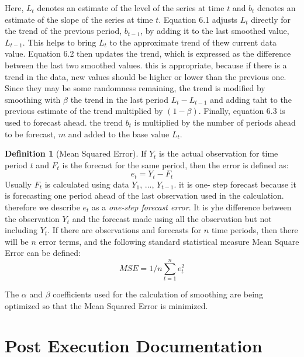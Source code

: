 \documentclass[a4paper,11pt,twoside]{report}
\theoremstyle{definition}
\newtheorem{definition}[theorem]{Definition}
\begin{document}
Here, $L_t$ denotes an estimate of the level of the series at time $t$ and $b_t$ denotes an estimate of the slope of the series at time $t$. Equation 6.1 adjusts $L_t$ directly for the trend of the previous period, $b_{t-1}$, by adding it to the last smoothed value, $L_{t-1}$. This helps to bring $L_t$ to the approximate trend of thew current data value. Equation 6.2 then updates the trend, which is expressed as the difference between the last two smoothed values. this is appropriate, because if there is a trend in the data, new values should be higher or lower than the previous one. Since they may be some randomness remaining, the trend is modified by smoothing with $\beta$ the trend in the last period $L_t - L_{t-1}$ and adding taht to the previous estimate of the trend multiplied by $ (1 - \beta)$. Finally, equation 6.3 is used to forecast ahead. the trend $b_t$ is multiplied by the number of periods ahead to be forecast, $m$ and added to the base value $L_t$.
\begin{definition}[Mean Squared Error]
If $Y_t$ is the actual observation for time period $t$ and $F_t$ is the forecast for the same period, then the error is defined as:
\begin{equation}\label{Error}
e_t = Y_t - F_t
\end{equation}
Usually $F_t$ is calculated using data $Y_1$, ..., $Y_{t-1}$. it is one- step forecast because it is forecasting one period ahead of the last observation used in the calculation. therefore we describe $e_t$ as a \textit{one-step forecast error}. It is yhe difference between the observation $Y_t$ and the forecast made using all the observation but not including $Y_t$.
If there are observations and forecasts for $n$ time periods, then there will be $n$ error terms, and the following standard statistical measure Mean Square Error can be defined:
\begin{equation}\label{Mean Squared Error}
MSE = 1/n \sum_{t=1}^{n} e_t^{2} 
\end{equation}

\end{definition}
The $\alpha$ and $\beta$ coefficients used for the calculation of smoothing are being optimized so that the Mean Squared Error is minimized.



\chapter{Post Execution Documentation}
\end{document}
